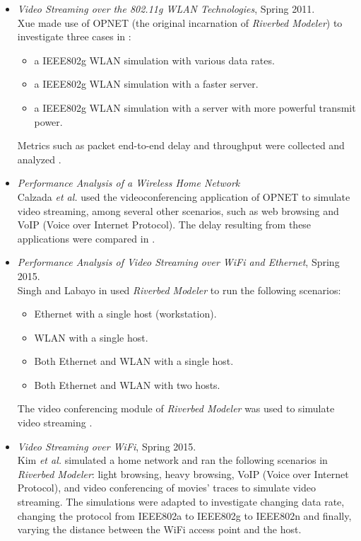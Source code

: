 \begin{itemize}
	\item \textit{Video Streaming over the 802.11g \gls{WLAN} Technologies}, Spring 2011. \cite{xue} \\
	Xue made use of \gls{OPNET} (the original incarnation of \textit{Riverbed Modeler}) to investigate three cases in \cite{xue}:
	\begin{itemize}
		\item a \gls{IEEE802}g \gls{WLAN} simulation with various data rates.
		\item a \gls{IEEE802}g \gls{WLAN} simulation with a faster server.
		\item a \gls{IEEE802}g \gls{WLAN} simulation with a server with more powerful transmit power.
	\end{itemize}
	Metrics such as packet end-to-end delay and throughput were collected and analyzed \cite{xue}.
	\item \textit{Performance Analysis of a Wireless Home Network} \cite{calzada} \\
	Calzada \textit{et al.} used the videoconferencing application of \gls{OPNET} to simulate video streaming, among several other scenarios, such as web browsing and \gls{VoIP} (Voice over Internet Protocol). The delay resulting from these applications were compared in \cite{calzada}.
	\item \textit{Performance Analysis of Video Streaming over \gls{WiFi} and Ethernet}, Spring 2015. \cite{arshit} \\
	Singh and Labayo in \cite{arshit} used \textit{Riverbed Modeler} to run the following scenarios:
	\begin{itemize}
		\item Ethernet with a single host (workstation).
		\item \gls{WLAN} with a single host.
		\item Both Ethernet and \gls{WLAN} with a single host.
		\item Both Ethernet and \gls{WLAN} with two hosts.
	\end{itemize}
	The video conferencing module of \textit{Riverbed Modeler} was used to simulate video streaming \cite{arshit}.
	\item \textit{Video Streaming over \gls{WiFi}}, Spring 2015. \cite{kim} \\
	Kim \textit{et al.} simulated a home network and ran the following scenarios in \textit{Riverbed Modeler}: light browsing, heavy browsing, \gls{VoIP} (Voice over Internet Protocol), and video conferencing of movies' traces to simulate video streaming. \cite{kim} The simulations were adapted to investigate changing data rate, changing the protocol from \gls{IEEE802}a to \gls{IEEE802}g  to \gls{IEEE802}n and finally, varying the distance between the \gls{WiFi} access point and the host. \cite{kim}

\end{itemize}
